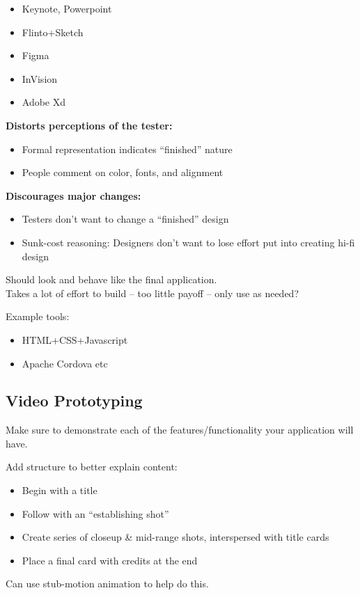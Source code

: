 \begin{itemize}
    \item Keynote, Powerpoint
    \item Flinto+Sketch
    \item Figma
    \item InVision
    \item Adobe Xd
\end{itemize}

\textbf{Distorts perceptions of the tester:}
\begin{itemize}
    \item Formal representation indicates “finished” nature
    \item People comment on color, fonts, and alignment
\end{itemize}

\textbf{Discourages major changes:}
\begin{itemize}
    \item Testers don’t want to change a “finished” design
    \item Sunk-cost reasoning: Designers don’t want to lose effort put into creating hi-fi design
\end{itemize}

Should look and behave like the final application.\\
Takes a lot of effort to build -- too little payoff -- only use as needed?

Example tools: 
\begin{itemize}
    \item HTML+CSS+Javascript
    \item Apache Cordova etc
\end{itemize}

\subsection{Video Prototyping}
Make sure to demonstrate each of the features/functionality your application will have.

Add structure to better explain content:
\begin{itemize}
    \item Begin with a title
    \item Follow with an “establishing shot”
    \item Create series of closeup \& mid-range shots, interspersed with title cards
    \item Place a final card with credits at the end
\end{itemize}

Can use stub-motion animation to help do this.
